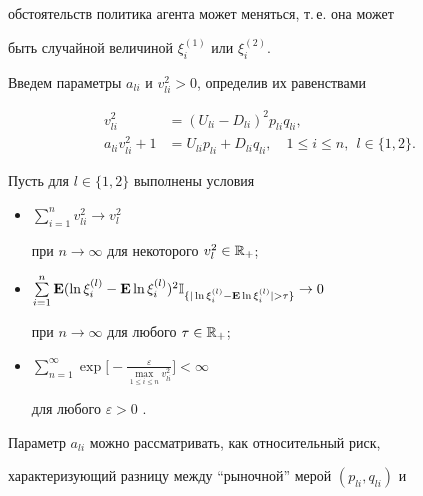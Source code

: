 обстоятельств политика агента может меняться, т.\,е. она может


быть случайной величиной $\xi_{i}^{(1)}$ или $\xi_{i}^{(2)}$.





Введем параметры $a_{li}$ и $v^2_{li}>0$, определив их равенствами


\begin{equation}\label{1}


\begin{split}


v^2_{li}&=(U_{li}-D_{li})^2p_{li}q_{li},\\


a_{li}v^2_{li} +1 &=U_{li}p_{li} + D_{li}q_{li},


\quad 1\le i\le n,\ \ l\in\{1,2\}.


\end{split}


\end{equation}





Пусть для $l\in\{1,2\}$ выполнены условия


\begin{itemize}


\item[$(1')$]$ \sum\limits_{i=1}^{n}v^2_{li} \rightarrow v^2_l$


при $n\rightarrow\infty$ для некоторого $v^2_l\in \Bbb R_+$;


\item[$(2')$] $\sum\limits_{i=1}^{n}\E(\ln \xi_{i}^{(l)}-\E\ln\xi_{i}^{(l)})^2


\IND_{\{|\ln \xi_{i}^{(l)}-\E\ln\xi_{i}^{(l)}|>\tau\}}\rightarrow 0$


при $n\rightarrow\infty$ для любого $\tau \in \Bbb R_+$;


\item[$(3')$] $\sum\limits_{n=1}^{\infty}


\exp\big[-\frac{\varepsilon}{\max\limits_{1 \le i\le n}v^2_{li}}\big]<\infty$


для любого $\varepsilon>0$ .


\end{itemize}





Параметр $a_{li}$ можно рассматривать, как относительный риск,


характеризующий разницу между ``рыночной'' мерой $(p_{li}, q_{li})$ и


